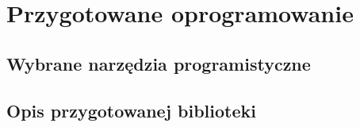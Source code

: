 \chapter{Przygotowane oprogramowanie}
\section{Wybrane narzędzia programistyczne}
\section{Opis przygotowanej biblioteki}